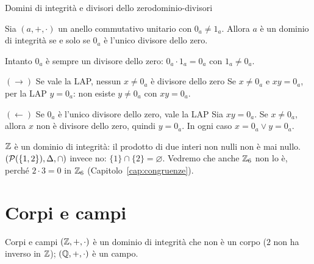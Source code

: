 \begin{concetto}
\begin{Corollario}{Domini di integrità e divisori dello zero}{dominio-divisori}
    \begin{prerequisiti}
    \end{prerequisiti}
    Sia $(a, +, \cdot)$ un anello commutativo unitario con $0_a \neq 1_a$. Allora $a$ è un dominio di integrità se e solo se $0_a$ è l'unico
    divisore dello zero.
\end{Corollario}
\begin{dimostrazione}
    Intanto $0_a$ è sempre un divisore dello zero: $0_a \cdot 1_a = 0_a$ con $1_a \neq 0_a$.
    \begin{caso}{$(\rightarrow)$ Se vale la LAP, nessun $x \neq 0_a$ è divisore dello zero}
        Se $x \neq 0_a$ e $xy = 0_a$, per la LAP $y = 0_a$: non esiste $y \neq 0_a$ con $xy = 0_a$.
    \end{caso}
    \begin{caso}{$(\leftarrow)$ Se $0_a$ è l'unico divisore dello zero, vale la LAP}
        Sia $xy = 0_a$. Se $x \neq 0_a$, allora $x$ non è divisore dello zero, quindi $y = 0_a$. In ogni caso $x = 0_a \vee y = 0_a$.
    \end{caso}
\end{dimostrazione}
\end{concetto}

\begin{spiegazione}
    $\mathbb{Z}$ è un dominio di integrità: il prodotto di due interi non nulli non è mai nullo. $(\mathcal{P}(\{1, 2\}), \Delta, \cap)$ invece no: $\{1\} \cap \{2\} = \varnothing$. Vedremo
    che anche $\mathbb{Z}_6$ non lo è, perché $2 \cdot 3 = 0$ in $\mathbb{Z}_6$ (Capitolo~\ref{cap:congruenze}).
\end{spiegazione}


\section{Corpi e campi}\label{sec:campi}


\begin{esempio}{Corpi e campi}
    $(\mathbb{Z}, +, \cdot)$ è un dominio di integrità che non è un corpo ($2$ non ha inverso in $\mathbb{Z}$); $(\mathbb{Q}, +, \cdot)$ è un campo.
\end{esempio}


